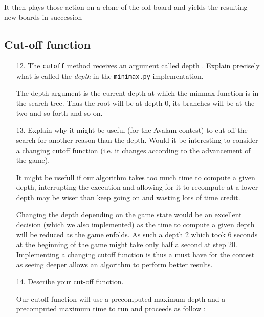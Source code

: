 \begin{enumerate}
\begin{framed}
        It then plays those action on a clone of the old board and yields the resulting new boards in succession
    \end{framed}
\end{enumerate}

\subsection{Cut-off function}

\begin{enumerate}
    \item[12.] The \verb#cutoff# method receives an argument called depth . Explain precisely what is called the \textit{depth} in the \verb#minimax.py# implementation.
    \begin{framed}
        The depth argument is the current depth at which the minmax function is in the search tree. Thus the root will be at depth 0, its branches will be at the two and so forth and so on.
    \end{framed}
    \item[13.] Explain why it might be useful (for the Avalam contest) to cut off the search for another reason than the depth. Would it be interesting to consider a changing cutoff function (i.e. it changes according to the advancement of the game).
    \begin{framed}
        It might be usefull if our algorithm takes too much time to compute a given depth, interrupting the execution and allowing for it to recompute at a lower depth may be wiser than keep going on and wasting lots of time credit. \newline

        Changing the depth depending on the game state would be an excellent decision (which we also implemented) as the time to compute a given depth will be reduced as the game enfolds. As such a depth 2 which took 6 seconds at the beginning of the game might take only half a second at step 20. Implementing a changing cutoff function is thus a must have for the contest as seeing deeper allows an algorithm to perform better results.
    \end{framed}
    \item[14.] Describe your cut-off function.
    \begin{framed}
        Our cutoff function will use a precomputed maximum depth and a precomputed maximum time to run and proceeds as follow :


\end{framed}
\end{enumerate}
